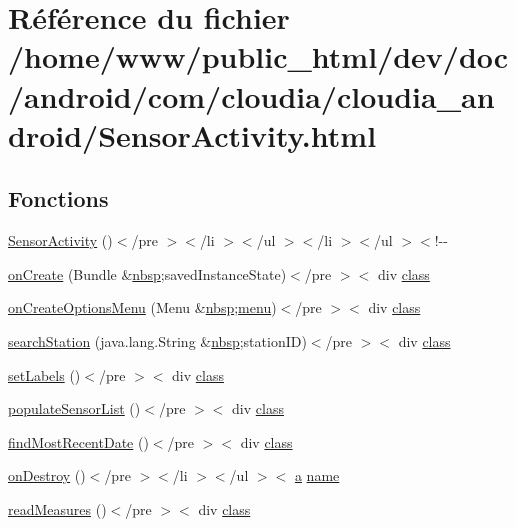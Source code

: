 \hypertarget{_sensor_activity_8html}{\section{Référence du fichier /home/www/public\-\_\-html/dev/doc/android/com/cloudia/cloudia\-\_\-android/\-Sensor\-Activity.html}
\label{_sensor_activity_8html}
}
\subsection*{Fonctions}
\begin{DoxyCompactItemize}
\item 
\hyperlink{_sensor_activity_8html_add0adac3660181e9dae9cc041298c724}{Sensor\-Activity} ()$<$/pre $>$$<$/li $>$$<$/ul $>$$<$/li $>$$<$/ul $>$$<$!-\/-\/
\item 
\hyperlink{_sensor_activity_8html_aba0a51a46194045c19fd67aa9ed0dd44}{on\-Create} (Bundle \&\hyperlink{_tools_8html_aef915316f784c9063d942974538301a6}{nbsp};saved\-Instance\-State)$<$/pre $>$$<$ div \hyperlink{_tools_8html_acf06f836132665ba8114f5a414c2403f}{class}
\item 
\hyperlink{_sensor_activity_8html_ad8d185357392942cfdc98d8a6f3e53d3}{on\-Create\-Options\-Menu} (Menu \&\hyperlink{_tools_8html_aef915316f784c9063d942974538301a6}{nbsp};\hyperlink{index-11_8html_a130970675bc563bd79bc2a7254add303}{menu})$<$/pre $>$$<$ div \hyperlink{_tools_8html_acf06f836132665ba8114f5a414c2403f}{class}
\item 
\hyperlink{_sensor_activity_8html_aed571f07b355fa787f03f9d4bb0089b0}{search\-Station} (java.\-lang.\-String \&\hyperlink{_tools_8html_aef915316f784c9063d942974538301a6}{nbsp};station\-I\-D)$<$/pre $>$$<$ div \hyperlink{_tools_8html_acf06f836132665ba8114f5a414c2403f}{class}
\item 
\hyperlink{_sensor_activity_8html_a5fc238e434ffb5f85434fd333dfeffb8}{set\-Labels} ()$<$/pre $>$$<$ div \hyperlink{_tools_8html_acf06f836132665ba8114f5a414c2403f}{class}
\item 
\hyperlink{_sensor_activity_8html_a8464870de980fbe4c88d9a4d4090e2fe}{populate\-Sensor\-List} ()$<$/pre $>$$<$ div \hyperlink{_tools_8html_acf06f836132665ba8114f5a414c2403f}{class}
\item 
\hyperlink{_sensor_activity_8html_a8d59e233dbb0571514c2254e2d868312}{find\-Most\-Recent\-Date} ()$<$/pre $>$$<$ div \hyperlink{_tools_8html_acf06f836132665ba8114f5a414c2403f}{class}
\item 
\hyperlink{_sensor_activity_8html_a75cc3a642e02f8e703eca0b91c08d013}{on\-Destroy} ()$<$/pre $>$$<$/li $>$$<$/ul $>$$<$ \hyperlink{style_8css_a5e8981582017bb8b84c21f148345d1f7}{a} \hyperlink{_cloudia_d_b_8html_ab74e6bf80237ddc4109968cedc58c151}{name}
\item 
\hyperlink{_sensor_activity_8html_acbfe59112241cdc01bed1c5f02fa7562}{read\-Measures} ()$<$/pre $>$$<$ div \hyperlink{_tools_8html_acf06f836132665ba8114f5a414c2403f}{class}
\end{DoxyCompactItemize}
